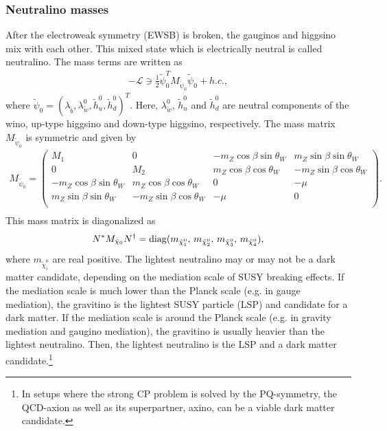 \documentclass[preprint,3p,12pt]{elsarticle}
\begin{document}
\subsubsection{Neutralino masses}
After the electroweak symmetry (EWSB) is broken, the gauginos and higgsino mix with each other. 
This mixed state which is electrically neutral is called neutralino. The mass terms are written as
\begin{eqnarray}
-\mathcal{L} \ni \frac{1}{2}\tilde \psi_0^T M_{\tilde \psi_0} \tilde \psi_0 + h.c.,
\end{eqnarray}
where $\tilde \psi_0 = (\lambda_{\tilde b}, \lambda_{\tilde w}^0, \tilde h_u^0, \tilde h_d^0)^T$. Here, $\lambda_{\tilde w}^0$, $\tilde h_u^0$ and $\tilde h_d^0$ are neutral components of the wino, up-type higgsino and down-type higgsino, respectively. The mass matrix $M_{\tilde \psi_0}$ is symmetric and given by
\begin{eqnarray}
M_{\tilde \psi_0} = 
\left(
\begin{array}{cccc}
M_1  &  0  & -m_Z \cos\beta\sin\theta_W & m_Z \sin\beta\sin\theta_W   \\
0  &  M_2  & m_Z \cos\beta \cos\theta_W & -m_Z\sin\beta \cos\theta_W \\
-m_Z \cos\beta\sin\theta_W &  m_Z\cos\beta \cos\theta_W  &  0& -\mu \\
 m_Z\sin\beta\sin\theta_W &  -m_Z\sin\beta \cos\theta_W  &  -\mu  & 0\\
\end{array}
\right). \nonumber \\
\end{eqnarray}
This mass matrix is diagonalized as
\begin{eqnarray}
N^* M_{\tilde \chi_0} N^\dag = {\rm diag}(m_{\tilde \chi_1^0},\,
m_{\tilde \chi_2^0}, \,
m_{\tilde \chi_3^0},\, m_{\tilde \chi_4^0}),
\end{eqnarray}
where $m_{\tilde \chi_i^0}$ are real positive. 
%
%
The lightest neutralino may or may not be a dark matter candidate, depending on the mediation scale of SUSY breaking effects.  
If the mediation scale is much lower than the Planck scale (e.g. in gauge mediation), 
the gravitino is the lightest SUSY particle (LSP) and candidate for a dark matter. 
If the mediation scale is around the Planck scale (e.g. in gravity mediation and gaugino mediation), 
the gravitino is usually heavier than the lightest neutralino. Then, the lightest neutralino is the LSP and a dark matter candidate.\footnote{
%
In setups where the strong CP problem is solved by the PQ-symmetry, 
the QCD-axion as well as its superpartner, axino, can be a viable dark matter candidate.  
%
} 
\end{document}
